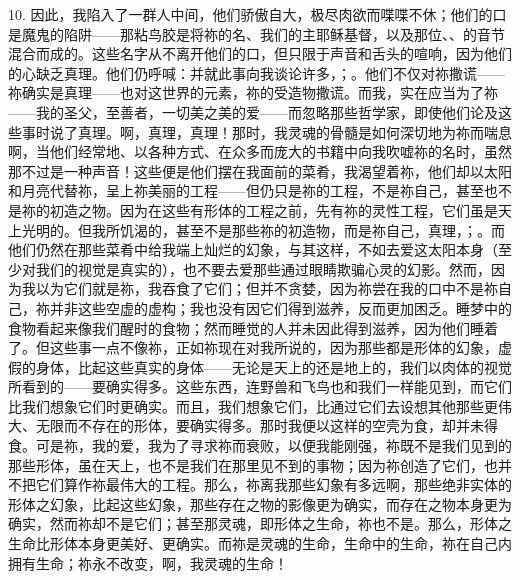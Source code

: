 10. 因此，我陷入了一群人中间，他们骄傲自大，极尽肉欲而喋喋不休；他们的口是魔鬼的陷阱——那粘鸟胶是将祢的名、我们的主耶稣基督，以及那位、、的音节混合而成的。这些名字从不离开他们的口，但只限于声音和舌头的喧响，因为他们的心缺乏真理。他们仍呼喊：并就此事向我谈论许多，；。他们不仅对祢撒谎——祢确实是真理——也对这世界的元素，祢的受造物撒谎。而我，实在应当为了祢——我的圣父，至善者，一切美之美的爱——而忽略那些哲学家，即使他们论及这些事时说了真理。啊，真理，真理！那时，我灵魂的骨髓是如何深切地为祢而喘息啊，当他们经常地、以各种方式、在众多而庞大的书籍中向我吹嘘祢的名时，虽然那不过是一种声音！这些便是他们摆在我面前的菜肴，我渴望着祢，他们却以太阳和月亮代替祢，呈上祢美丽的工程——但仍只是祢的工程，不是祢自己，甚至也不是祢的初造之物。因为在这些有形体的工程之前，先有祢的灵性工程，它们虽是天上光明的。但我所饥渴的，甚至不是那些祢的初造物，而是祢自己，真理，；。而他们仍然在那些菜肴中给我端上灿烂的幻象，与其这样，不如去爱这太阳本身（至少对我们的视觉是真实的），也不要去爱那些通过眼睛欺骗心灵的幻影。然而，因为我以为它们就是祢，我吞食了它们；但并不贪婪，因为祢尝在我的口中不是祢自己，祢并非这些空虚的虚构；我也没有因它们得到滋养，反而更加困乏。睡梦中的食物看起来像我们醒时的食物；然而睡觉的人并未因此得到滋养，因为他们睡着了。但这些事一点不像祢，正如祢现在对我所说的，因为那些都是形体的幻象，虚假的身体，比起这些真实的身体——无论是天上的还是地上的，我们以肉体的视觉所看到的——要确实得多。这些东西，连野兽和飞鸟也和我们一样能见到，而它们比我们想象它们时更确实。而且，我们想象它们，比通过它们去设想其他那些更伟大、无限而不存在的形体，要确实得多。那时我便以这样的空壳为食，却并未得食。可是祢，我的爱，我为了寻求祢而衰败，以便我能刚强，祢既不是我们见到的那些形体，虽在天上，也不是我们在那里见不到的事物；因为祢创造了它们，也并不把它们算作祢最伟大的工程。那么，祢离我那些幻象有多远啊，那些绝非实体的形体之幻象，比起这些幻象，那些存在之物的影像更为确实，而存在之物本身更为确实，然而祢却不是它们；甚至那灵魂，即形体之生命，祢也不是。那么，形体之生命比形体本身更美好、更确实。而祢是灵魂的生命，生命中的生命，祢在自己内拥有生命；祢永不改变，啊，我灵魂的生命！\par

